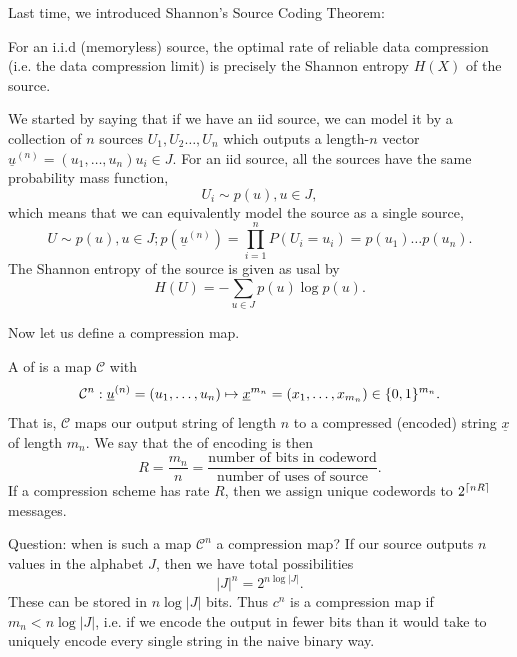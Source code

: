 Last time, we introduced Shannon's Source Coding Theorem:
\begin{thm}
    For an i.i.d (memoryless) source, the optimal rate of reliable data compression (i.e. the data compression limit) is precisely the Shannon entropy $H(X)$ of the source.
\end{thm}

We started by saying that if we have an iid source, we can model it by a collection of $n$ sources $U_1,U_2\ldots, U_n$ which outputs a length-$n$ vector $\underline{u}^{(n)}=(u_1,\ldots, u_n) u_i \in J$. For an iid source, all the sources have the same probability mass function,
\begin{equation*}
    U_i \sim p(u), u\in J,
\end{equation*}
which means that we can equivalently model the source as a single source,
\begin{equation*}
    U\sim p(u), u\in J; p(\underline{u}^{(n)}) =\prod_{i=1}^n P(U_i=u_i)= p(u_1)\ldots p(u_n).
\end{equation*}
The Shannon entropy of the source is given as usal by
\begin{equation}
    H(U)=-\sum_{u\in J} p(u)\log p(u).
\end{equation}

Now let us define a compression map.
\begin{defn}
    A  of  is a map $\mathcal C$ with
    \begin{equation}
        \mathcal{C}^n : \underline{u}^{(n)}=(u_1,\ldots, u_n) \mapsto \underline{x}^{m_n}=(x_1,\ldots, x_{m_n}) \in \{0,1\}^{m_n}.
    \end{equation}
    That is, $\mathcal{C}$ maps our output string of length $n$ to a compressed (encoded) string $\underline x$ of length $m_n$. We say that the  of encoding is then
    \begin{equation}
        R=\frac{m_n}{n}=\frac{\text{number of bits in codeword}}{\text{number of uses of source}}.
    \end{equation}
    If a compression scheme has rate $R$, then we assign unique codewords to $2^{\lceil nR\rceil}$ messages.
\end{defn}

Question: when is such a map $\mathcal{C}^n$ a compression map? If our source outputs $n$ values in the alphabet $J$, then we have total possibilities
\begin{equation}
    |J|^n=2^{n\log |J|}.
\end{equation}
These can be stored in $n\log |J|$ bits. Thus $c^n$ is a compression map if $m_n < n\log |J|$, i.e. if we encode the output in fewer bits than it would take to uniquely encode every single string in the naive binary way.

